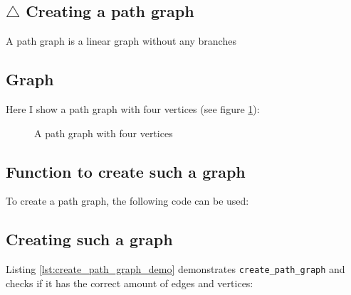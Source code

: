 \subsection{$\triangle$ Creating a path graph}
\label{subsec:create_path_graph}

A path graph is a linear graph without any branches

\subsection{Graph}

Here I show a path graph with four vertices 
(see figure \ref{fig:create_path_graph}):

\begin{figure}
  \caption{A path graph with four vertices}
  \label{fig:create_path_graph}
\end{figure}

\subsection{Function to create such a graph}

To create a path graph, the following code can be used:



\subsection{Creating such a graph}

Listing \ref{lst:create_path_graph_demo}
demonstrates \verb;create_path_graph; 
and checks if it has the correct amount of edges and vertices:



